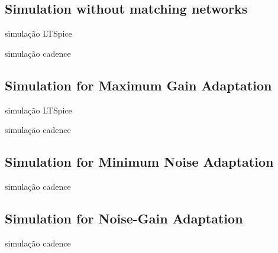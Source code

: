 \subsection{Simulation without matching networks}

simulação LTSpice

simulação cadence

\subsection{Simulation for Maximum Gain Adaptation}

simulação LTSpice

simulação cadence


\subsection{Simulation for Minimum Noise Adaptation}

simulação cadence

\subsection{Simulation for Noise-Gain Adaptation}

simulação cadence